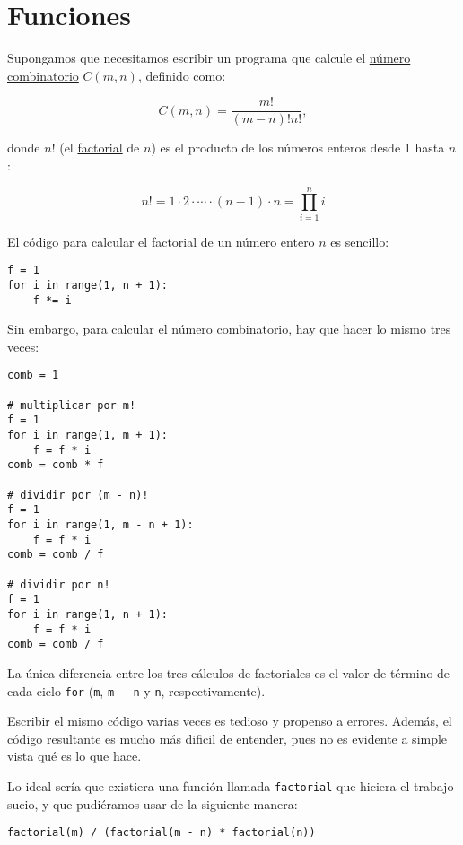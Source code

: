 \chapter{Funciones}

Supongamos que necesitamos escribir un programa que calcule el
\href{http://es.wikipedia.org/wiki/Número\_combinatorio}{número
combinatorio} \(C(m, n)\), definido como:

\[C(m, n) = \frac{m!}{(m - n)! n!},\]

donde \(n!\) (el \href{http://es.wikipedia.org/wiki/Factorial}{factorial}
de \(n\)) es el producto de los números enteros desde 1 hasta \(n\):

\[n! = 1\cdot 2\cdot\cdots\cdot(n - 1)\cdot n = \prod_{i=1}^n i\]

El código para calcular el factorial de un número entero \(n\) es
sencillo:

\begin{lstlisting}
f = 1
for i in range(1, n + 1):
    f *= i
\end{lstlisting}

Sin embargo, para calcular el número combinatorio, hay que hacer lo
mismo tres veces:

\begin{lstlisting}
comb = 1

# multiplicar por m!
f = 1
for i in range(1, m + 1):
    f = f * i
comb = comb * f

# dividir por (m - n)!
f = 1
for i in range(1, m - n + 1):
    f = f * i
comb = comb / f

# dividir por n!
f = 1
for i in range(1, n + 1):
    f = f * i
comb = comb / f
\end{lstlisting}

La única diferencia entre los tres cálculos de factoriales es el valor
de término de cada ciclo \lstinline!for! (\lstinline!m!,
\lstinline!m - n! y \lstinline!n!, respectivamente).

Escribir el mismo código varias veces es tedioso y propenso a errores.
Además, el código resultante es mucho más dificil de entender, pues no
es evidente a simple vista qué es lo que hace.

Lo ideal sería que existiera una función llamada \lstinline!factorial!
que hiciera el trabajo sucio, y que pudiéramos usar de la siguiente
manera:

\begin{lstlisting}
factorial(m) / (factorial(m - n) * factorial(n))
\end{lstlisting}

